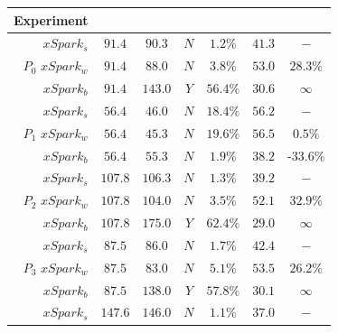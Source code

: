 \begin{table}[tbhp]
	\centering
	\begin{tabular}{r|c|c|c|c|c|c}
		\multicolumn{1}{c|}{\textbf{Experiment}}   &
		\rotatebox{90}{\boldmath$deadline\,[s]$}  &  \rotatebox{90}{\boldmath$exec\_time\,[s]$}  & \rotatebox{90}{\boldmath$violation$} &  \rotatebox{90}{\boldmath$error$}    & \rotatebox{90}{\boldmath$core\_alloc\,[\frac{core}{s}]$}  & \rotatebox{90}{\boldmath$penalty$}   \\
		\midrule
		$xSpark_s$  & $91.4$   & $90.3$   & $N$   & $1.2\%$   & $41.3$   & $-$  \\
		$P_0 \,\,xSpark_w$  & $91.4$   & $88.0$   & $N$   & $3.8\%$   & $53.0$   & $28.3\%$  \\
		$xSpark_b$  & $91.4$   & $143.0$   & $Y$   & $56.4\%$   & $30.6$   & $\infty$  \\
		\midrule
		$xSpark_s$  & $56.4$   & $46.0$   & $N$   & $18.4\%$   & $56.2$   & $-$  \\
		$P_1 \,\,xSpark_w$  & $56.4$   & $45.3$   & $N$   & $19.6\%$   & $56.5$   & $0.5\%$  \\
		$xSpark_b$  & $56.4$   & $55.3$   & $N$   & $1.9\%$   & $38.2$   & $\text{-}33.6\%$  \\
		\midrule
		$xSpark_s$  & $107.8$   & $106.3$   & $N$   & $1.3\%$   & $39.2$   & $-$  \\
		$P_2 \,\,xSpark_w$  & $107.8$   & $104.0$   & $N$   & $3.5\%$   & $52.1$   & $32.9\%$  \\
		$xSpark_b$  & $107.8$   & $175.0$   & $Y$   & $62.4\%$   & $29.0$   & $\infty$  \\
		\midrule
		$xSpark_s$  & $87.5$   & $86.0$   & $N$   & $1.7\%$   & $42.4$   & $-$  \\
		$P_3 \,\,xSpark_w$  & $87.5$   & $83.0$   & $N$   & $5.1\%$   & $53.5$   & $26.2\%$  \\
		$xSpark_b$  & $87.5$   & $138.0$   & $Y$   & $57.8\%$   & $30.1$   & $\infty$  \\
		\midrule
		$xSpark_s$  & $147.6$   & $146.0$   & $N$   & $1.1\%$   & $37.0$   & $-$  \\

\end{tabular}
\end{table}
